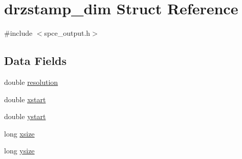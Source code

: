 \hypertarget{structdrzstamp__dim}{
\section{drzstamp\_\-dim Struct Reference}
\label{structdrzstamp__dim}
}


{\ttfamily \#include $<$spce\_\-output.h$>$}\subsection*{Data Fields}
\begin{DoxyCompactItemize}
\item 
double \hyperlink{structdrzstamp__dim_ab3c0ed305132ecda42a1e8b6dad5ce27}{resolution}
\item 
double \hyperlink{structdrzstamp__dim_af6df14c21230e289ef6abe7134de3cc3}{xstart}
\item 
double \hyperlink{structdrzstamp__dim_a9ed53e0c679cabe8bd15189b7b9b7a62}{ystart}
\item 
long \hyperlink{structdrzstamp__dim_a459626637b5697c339db9e2b31f3ded6}{xsize}
\item 
long \hyperlink{structdrzstamp__dim_a8e268f2124d4cc8783fe4f37708bbe8f}{ysize}
\end{DoxyCompactItemize}


